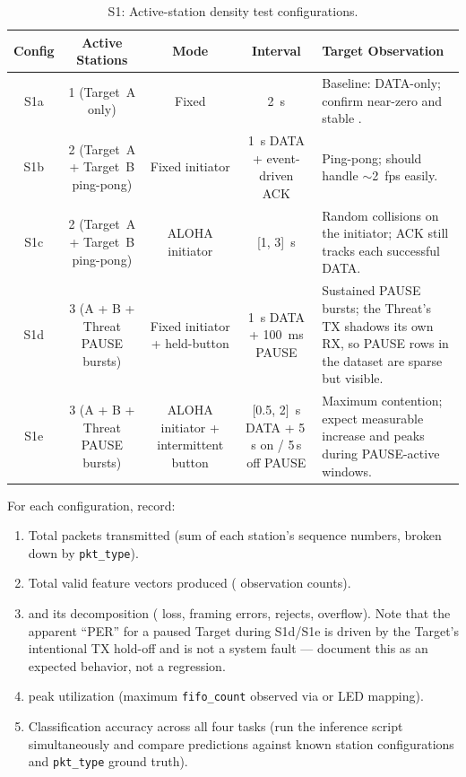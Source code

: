 \documentclass[11pt,letterpaper]{article}
\begin{document}
	\begin{table}[ht!]
		\centering
		\caption{S1: Active-station density test configurations.}
		\label{tab:s1}
		\renewcommand{\arraystretch}{1.3}
		\begin{tabularx}{\textwidth}{c c c c X}
			\toprule
			\textbf{Config} & \textbf{Active Stations} & \textbf{Mode} & \textbf{Interval} & \textbf{Target Observation} \\
			\midrule
			S1a & 1 (Target~A only)             & Fixed                          & 2~s                       & Baseline: DATA-only; confirm near-zero \PER{} and stable \FIFO{}. \\
			S1b & 2 (Target~A + Target~B ping-pong) & Fixed initiator                & 1~s DATA + event-driven ACK & Ping-pong; \FIFO{} should handle $\sim$2~fps easily. \\
			S1c & 2 (Target~A + Target~B ping-pong) & ALOHA initiator                & [1, 3]~s                  & Random collisions on the initiator; ACK still tracks each successful DATA. \\
			S1d & 3 (A + B + Threat PAUSE bursts) & Fixed initiator + held-button  & 1~s DATA + 100~ms PAUSE   & Sustained PAUSE bursts; the Threat's TX shadows its own RX, so PAUSE rows in the dataset are sparse but visible. \\
			S1e & 3 (A + B + Threat PAUSE bursts) & ALOHA initiator + intermittent button & [0.5, 2]~s DATA + 5\,s on / 5\,s off PAUSE & Maximum contention; expect measurable \PER{} increase and \FIFO{} peaks during PAUSE-active windows. \\
			\bottomrule
		\end{tabularx}
	\end{table}

	For each configuration, record:
	\begin{enumerate}[leftmargin=2em]
		\item Total packets transmitted (sum of each station's sequence numbers, broken down by \texttt{pkt\_type}).
		\item Total valid feature vectors produced (\FPGA{} observation counts).
		\item \PER{} and its decomposition (\RF{} loss, framing errors, \CRC{} rejects, \FIFO{} overflow). Note that the apparent ``PER'' for a paused Target during S1d/S1e is driven by the Target's intentional TX hold-off and is not a system fault --- document this as an expected behavior, not a regression.
		\item \FIFO{} peak utilization (maximum \texttt{fifo\_count} observed via \ILA{} or LED mapping).
		\item Classification accuracy across all four tasks (run the inference script simultaneously and compare predictions against known station configurations and \texttt{pkt\_type} ground truth).
	\end{enumerate}
\end{document}
